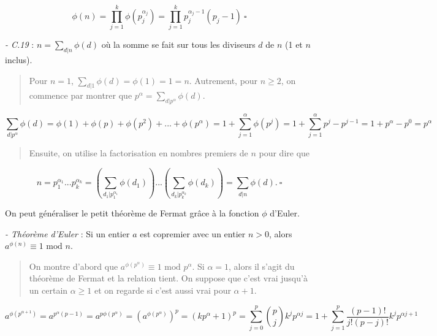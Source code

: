 \begin{equation*}
    \phi(n) = \prod_{j=1}^{k}\phi(p_j^{\alpha_j}) = \prod_{j=1}^{k}p_j^{\alpha_j - 1} (p_j - 1) \ \square
\end{equation*}

\textit{- C.19} : $n = \sum_{d|n}^{} \phi(d)$ où la somme se fait sur tous les diviseurs $d$ de $n$ (1 et $n$ inclus).

\begin{quote}
    Pour $n=1$, $\sum_{d|1}^{}\phi(d) = \phi(1) = 1 = n$. Autrement, pour $n \geq 2$, on commence par montrer que $p^{\alpha} = \sum_{d|p^{\alpha}}^{}\phi(d)$. 
\end{quote}

\begin{equation*}
    \sum_{d|p^{\alpha}}^{}\phi(d) = \phi(1) + \phi(p) + \phi(p^2) + ... + \phi(p^{\alpha}) = 1 + \sum_{j = 1}^{\alpha} \phi(p^j) = 1 + \sum_{j = 1}^{\alpha} p^j - p^{j-1} = 1 + p^{\alpha} - p^0 = p^{\alpha}
\end{equation*}

\begin{quote}
    Ensuite, on utilise la factorisation en nombres premiers de $n$ pour dire que 
\end{quote}

\begin{equation*}
    n = p_1^{\alpha_1}...p_k^{\alpha_k} = \left(\sum_{d_1|p_1^{\alpha_1}}^{}\phi(d_1)\right)...\left(\sum_{d_k|p_k^{\alpha_k}}^{}\phi(d_k)\right) = \sum_{d|n}^{} \phi(d). \ \square
\end{equation*}

On peut généraliser le petit théorème de Fermat grâce à la fonction $\phi$ d'Euler.

\textit{- Théorème d'Euler} : Si un entier $a$ est copremier avec un entier $n > 0$, alors $a^{\phi(n)} \equiv 1 \text{ mod } n$.

\begin{quote}
    On montre d'abord que $a^{\phi(p^{\alpha})} \equiv 1 \text{ mod } p^{\alpha}$. Si $\alpha = 1$, alors il s'agit du théorème de Fermat et la relation tient. On suppose que c'est vrai jusqu'à un certain $\alpha \geq 1$ et on regarde si c'est aussi vrai pour $\alpha + 1$.
\end{quote}

\begin{equation*}
    a^{\phi(p^{\alpha + 1})} = a^{p^{\alpha}(p-1)} = a^{p \phi(p^{\alpha})} = \left(a^{\phi(p^{\alpha})}\right)^p = \left(kp^{\alpha} + 1\right)^p = \sum_{j=0}^{p}\binom{p}{j}k^jp^{\alpha j} = 1 + \sum_{j=1}^{p}\frac{(p-1)!}{j!(p-j)!}k^j p^{\alpha j + 1}
\end{equation*}

